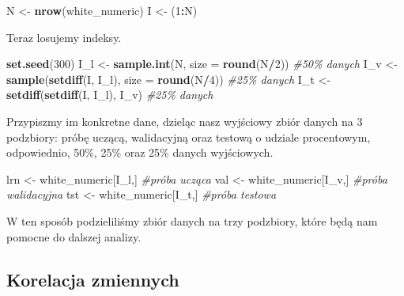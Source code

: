 \documentclass[
]{article}
\newenvironment{Shaded}{\begin{snugshade}}{\end{snugshade}}
\newcommand{\AttributeTok}[1]{\textcolor[rgb]{0.13,0.29,0.53}{#1}}
\newcommand{\CommentTok}[1]{\textcolor[rgb]{0.56,0.35,0.01}{\textit{#1}}}
\newcommand{\DecValTok}[1]{\textcolor[rgb]{0.00,0.00,0.81}{#1}}
\newcommand{\FunctionTok}[1]{\textcolor[rgb]{0.13,0.29,0.53}{\textbf{#1}}}
\newcommand{\NormalTok}[1]{#1}
\newcommand{\OtherTok}[1]{\textcolor[rgb]{0.56,0.35,0.01}{#1}}
\newcommand{\SpecialCharTok}[1]{\textcolor[rgb]{0.81,0.36,0.00}{\textbf{#1}}}
\begin{document}
\begin{Shaded}
\begin{Highlighting}[]
\NormalTok{N }\OtherTok{\textless{}{-}} \FunctionTok{nrow}\NormalTok{(white\_numeric)}
\NormalTok{I }\OtherTok{\textless{}{-}}\NormalTok{ (}\DecValTok{1}\SpecialCharTok{:}\NormalTok{N)}
\end{Highlighting}
\end{Shaded}

Teraz losujemy indeksy.

\begin{Shaded}
\begin{Highlighting}[]
\FunctionTok{set.seed}\NormalTok{(}\DecValTok{300}\NormalTok{)}
\NormalTok{I\_l }\OtherTok{\textless{}{-}} \FunctionTok{sample.int}\NormalTok{(N, }\AttributeTok{size =} \FunctionTok{round}\NormalTok{(N}\SpecialCharTok{/}\DecValTok{2}\NormalTok{)) }\CommentTok{\#50\% danych}
\NormalTok{I\_v }\OtherTok{\textless{}{-}} \FunctionTok{sample}\NormalTok{(}\FunctionTok{setdiff}\NormalTok{(I, I\_l), }\AttributeTok{size =} \FunctionTok{round}\NormalTok{(N}\SpecialCharTok{/}\DecValTok{4}\NormalTok{)) }\CommentTok{\#25\% danych}
\NormalTok{I\_t }\OtherTok{\textless{}{-}} \FunctionTok{setdiff}\NormalTok{(}\FunctionTok{setdiff}\NormalTok{(I, I\_l), I\_v) }\CommentTok{\#25\% danych}
\end{Highlighting}
\end{Shaded}

Przypiszmy im konkretne dane, dzieląc nasz wyjściowy zbiór danych na 3
podzbiory: próbę uczącą, walidacyjną oraz testową o udziale procentowym,
odpowiednio, 50\%, 25\% oraz 25\% danych wyjściowych.

\begin{Shaded}
\begin{Highlighting}[]
\NormalTok{lrn }\OtherTok{\textless{}{-}}\NormalTok{ white\_numeric[I\_l,] }\CommentTok{\#próba ucząca}
\NormalTok{val }\OtherTok{\textless{}{-}}\NormalTok{ white\_numeric[I\_v,] }\CommentTok{\#próba walidacyjna}
\NormalTok{tst }\OtherTok{\textless{}{-}}\NormalTok{ white\_numeric[I\_t,] }\CommentTok{\#próba testowa}
\end{Highlighting}
\end{Shaded}

W ten sposób podzieliliśmy zbiór danych na trzy podzbiory, które będą
nam pomocne do dalszej analizy.

\subsection{Korelacja zmiennych}\label{korelacja-zmiennych}
\end{document}
